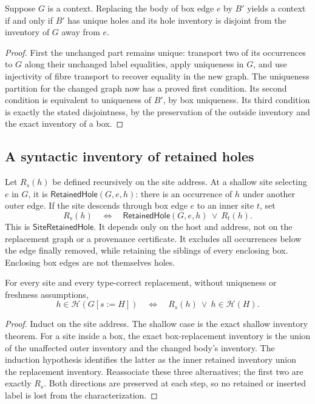 \begin{lemma}
Suppose $G$ is a context. Replacing the body of box edge $e$ by $B'$ yields a
context if and only if $B'$ has unique holes and its hole inventory is disjoint
from the inventory of $G$ away from $e$.
\end{lemma}
\begin{proof}
First the unchanged part remains unique: transport two of its occurrences to
$G$ along their unchanged label equalities, apply uniqueness in $G$, and use
injectivity of fibre transport to recover equality in the new graph.
The uniqueness partition for the changed graph now has a proved first
condition. Its second condition is equivalent to uniqueness of $B'$, by box
uniqueness. Its third condition is exactly the stated disjointness, by the
preservation of the outside inventory and the exact inventory of a box.
\end{proof}

\subsection{A syntactic inventory of retained holes}

\begin{definition}\label{term:site-retained-hole}
Let $R_s(h)$ be defined recursively on the site address. At a shallow site
selecting $e$ in $G$, it is $\mathsf{RetainedHole}(G,e,h)$: there is an occurrence
of $h$ under another outer edge. If the site descends through box edge $e$ to an
inner site $t$, set
\[
 R_s(h)\quad\Longleftrightarrow\quad
 \mathsf{RetainedHole}(G,e,h)\ \lor\ R_t(h).
\]
This is $\mathsf{SiteRetainedHole}$. It depends only on the host and address,
not on the replacement graph or a provenance certificate. It excludes all
occurrences below the edge finally removed, while retaining the siblings of
every enclosing box. Enclosing box edges are not themselves holes.
\end{definition}

\begin{theorem}
For every site and every type-correct replacement, without uniqueness or
freshness assumptions,
\[
 h\in\mathcal H(G[s:=H])\quad\Longleftrightarrow\quad
 R_s(h)\ \lor\ h\in\mathcal H(H).
\]
\end{theorem}
\begin{proof}
Induct on the site address. The shallow case is the exact shallow inventory
theorem. For a site inside a box, the exact box-replacement inventory is the
union of the unaffected outer inventory and the changed body's inventory.
The induction hypothesis identifies the latter as the inner retained inventory
union the replacement inventory. Reassociate these three alternatives; the
first two are exactly $R_s$. Both directions are preserved at each step, so no
retained or inserted label is lost from the characterization.
\end{proof}

